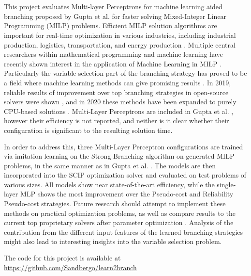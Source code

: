 \chapter*{\englishabstractname}
%
This project evaluates Multi-layer Perceptrons for machine learning aided branching proposed by Gupta et al. \cite{gupta2020hybrid}
for faster solving Mixed-Integer Linear Programming (\gls{MILP}) problems. 
Efficient \gls{MILP} solution algorithms are important for real-time optimization in various industries, including industrial production, logistics, transportation, and energy production \cite{junger2010years}.  %
Multiple central researchers within mathematical programming and machine learning have recently shown interest in the application of Machine Learning in \gls{MILP} \cite{bengio2020machine,bertsimas2019online}. Particularly the variable selection part of the branching strategy has proved to be a field where machine learning methods can give promising results \cite{khalil2020towards}.
In 2019, reliable results of improvement over top branching strategies in open-source solvers were shown \cite{gasse2019exact}, and in 2020 these methods have been expanded to purely \gls{CPU}-based solutions \cite{gupta2020hybrid}. Multi-Layer Perceptrons are included in Gupta et al. \cite{gupta2020hybrid}, however their efficiency is not reported, and neither is it clear whether their configuration is significant to the resulting solution time.

In order to address this, three Multi-Layer Perceptron configurations are trained via imitation learning on the Strong Branching algorithm on generated \gls{MILP} problems, in the same manner as in Gupta et al. \cite{gupta2020hybrid}. The models are then incorporated into the \gls{SCIP} optimization solver and evaluated on test problems of various sizes. All models show near state-of-the-art efficiency, while the single-layer \gls{MLP} shows the most improvement over the Pseudo-cost and Reliability Pseudo-cost strategies. 
Future research should attempt to implement these methods on practical optimization problems, as well as compare results to the current top proprietary solvers after parameter optimization \cite{hutter2010automated}. Analysis of the contribution from the different input features of the learned branching strategies might also lead to interesting insights into the variable selection problem. 

The code for this project is available at\\ \url{https://github.com/Sandbergo/learn2branch}
%
\clearpage

